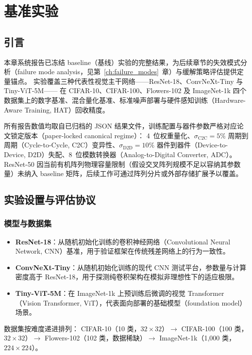 \chapter{基准实验}
\label{chap:benchmarks}

\section{引言}

本章系统报告已冻结 baseline（基线）实验的完整结果，为后续章节的失效模式分析（failure mode analysis，见第~\ref{ch:failure_modes}~章）与缓解策略评估提供定量锚点。
实验覆盖三种代表性视觉主干网络——ResNet-18、ConvNeXt-Tiny 与 Tiny-ViT-5M——
在 CIFAR-10、CIFAR-100、Flowers-102 及 ImageNet-1k 四个数据集上的数字基准、混合量化基准、标准噪声部署与硬件感知训练（Hardware-Aware Training, HAT）回收精度。

所有报告数值均取自已归档的 JSON 结果文件，训练配置与器件参数严格对应论文锁定版本（paper-locked canonical regime）：
4~位权重量化、$\sigma_{\mathrm{C2C}}=5\%$ 周期到周期（Cycle-to-Cycle, C2C）变异性、$\sigma_{\mathrm{D2D}}=10\%$ 器件到器件（Device-to-Device, D2D）失配、8~位模数转换器（Analog-to-Digital Converter, ADC）。
ResNet-50 因当前有机阵列物理容量限制（假设交叉阵列规模不足以容纳其参数量）未纳入 baseline 矩阵，后续工作可通过阵列分片或外部存储扩展予以覆盖。

\section{实验设置与评估协议}

\subsection{模型与数据集}

\begin{itemize}
    \item \textbf{ResNet-18}：从随机初始化训练的卷积神经网络（Convolutional Neural Network, CNN）基准，用于验证框架在传统残差网络上的行为一致性。
    \item \textbf{ConvNeXt-Tiny}：从随机初始化训练的现代 CNN 测试平台，参数量与计算密度高于 ResNet-18，用于探测纯卷积架构在模拟非理想性下的适应极限。
    \item \textbf{Tiny-ViT-5M}：在 ImageNet-1k 上预训练后微调的视觉 Transformer（Vision Transformer, ViT），代表面向部署的基础模型（foundation model）场景。
\end{itemize}

数据集按难度递进排列：
CIFAR-10（10 类，$32\times32$）$\rightarrow$ CIFAR-100（100 类，$32\times32$）$\rightarrow$
Flowers-102（102 类，数据稀缺）$\rightarrow$ ImageNet-1k（1{,}000 类，$224\times224$）。

